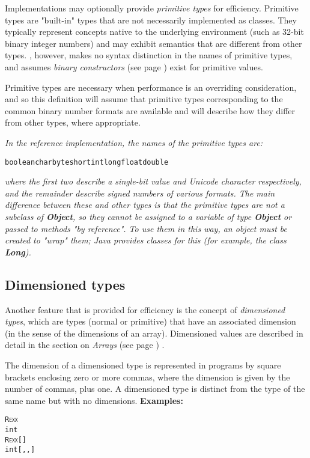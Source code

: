 Implementations may optionally provide \emph{primitive types} for
efficiency.
Primitive types are "built-in" types that are not necessarily
implemented as classes.
They typically represent concepts native to the underlying environment
(such as 32-bit binary integer numbers) and may exhibit semantics that
are different from other types.  \nr{}, however, makes no syntax
distinction in the names of primitive types, and assumes
 \emph{binary constructors} (see page \pageref{refbincon})  exist for primitive
values.
 
Primitive types are necessary when performance is an overriding
consideration, and so this definition will assume that primitive types
corresponding to the common binary number formats are available and will
describe how they differ from other types, where appropriate.
 
\emph{In the reference implementation, the names of the primitive types
are:}
\begin{alltt}
boolean char byte short int long float double
\end{alltt}
\emph{where the first two describe a single-bit value and Unicode
character respectively, and the remainder describe signed numbers of
various formats.
The main difference between these and other types is that the primitive
types are not a subclass of \textbf{Object}, so they cannot be
assigned to a variable of type \textbf{Object} or passed to methods
"by reference".  To use them in this way, an object must be created
to "wrap" them; Java provides classes for this (for example, the
class \textbf{Long}).
}
\subsection{Dimensioned types}\label{refdimtype}
 
Another feature that is provided for efficiency is the concept of
\emph{dimensioned types}, which are types (normal or primitive) that
have an associated dimension (in the sense of the dimensions of an
array).  Dimensioned values are described in detail in the section on
 \emph{Arrays} (see page \pageref{refarray}) .
 
The dimension of a dimensioned type is represented in \nr{} programs
by square brackets enclosing zero or more commas, where the dimension is
given by the number of commas, plus one.  A dimensioned type is distinct
from the type of the same name but with no dimensions.
 \textbf{Examples:}
\begin{alltt}
R\textsc{exx}
int
R\textsc{exx}[]
int[,,]
\end{alltt}

